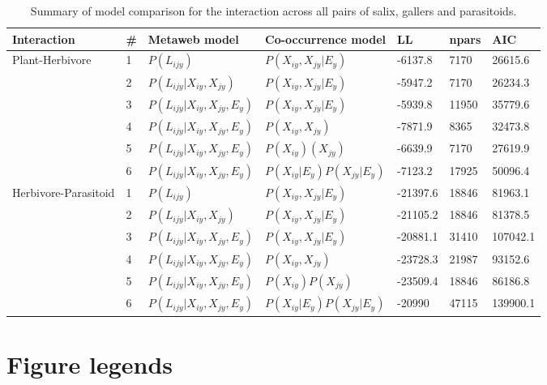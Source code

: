 \documentclass[12pt]{article}
\begin{document}
\begin{landscape}
\begin{table}[]
\centering 
\caption{Summary of model comparison for the interaction across all pairs of salix, gallers and parasitoids.}
\begin{tabular}{lllllll}
\hline
	Interaction & \# & Metaweb model & Co-occurrence model & LL & npars & AIC \\ \hline
	Plant-Herbivore & 1 & $P(L_{ijy})$ & $P(X_{iy},X_{jy}|E_y)$ & -6137.8 & 7170 & 26615.6 \\ 
	 & 2 & $P(L_{ijy}|X_{iy},X_{jy})$ & $P(X_{iy},X_{jy}|E_y)$ & -5947.2 & 7170 & 26234.3 \\ 
	 & 3 & $P(L_{ijy} | X_{iy}, X_{jy}, E_y)$ & $P(X_{iy},X_{jy}|E_y)$ & -5939.8 & 11950 & 35779.6 \\
	 & 4 & $P(L_{ijy} | X_{iy}, X_{jy}, E_y)$ & $P(X_{iy},X_{jy})$ & -7871.9 & 8365 & 32473.8 \\ 
	 & 5 & $P(L_{ijy} | X_{iy}, X_{jy}, E_y)$ & $P(X_{iy})(X_{jy})$ & -6639.9 & 7170 & 27619.9 \\ 
	 & 6 & $P(L_{ijy} | X_{iy}, X_{jy}, E_y)$ & $P(X_{iy}|E_y)P(X_{jy}|E_y)$ & -7123.2 & 17925 & 50096.4 \\ \hline
	Herbivore-Parasitoid & 1 & $P(L_{ijy})$ & $P(X_{iy},X_{jy}|E_y)$ & -21397.6 & 18846 & 81963.1 \\ 
	 & 2 & $P(L_{ijy} | X_{iy}, X_{jy})$ & $P(X_{iy},X_{jy}|E_y)$ & -21105.2 & 18846 & 81378.5 \\ 
	 & 3 & $P(L_{ijy} | X_{iy}, X_{jy}, E_y)$ & $P(X_{iy},X_{jy}|E_y)$ & -20881.1 & 31410 & 107042.1 \\ 
	 & 4 & $P(L_{ijy} | X_{iy}, X_{jy}, E_y)$ & $P(X_{iy},X_{jy})$ & -23728.3 & 21987 & 93152.6 \\ 
	 & 5 & $P(L_{ijy} | X_{iy}, X_{jy}, E_y)$ & $P(X_{iy})P(X_{jy})$ & -23509.4 & 18846 & 86186.8 \\ 
	 & 6 & $P(L_{ijy} | X_{iy}, X_{jy}, E_y)$ & $P(X_{iy}|E_y)P(X_{jy}|E_y)$ & -20990 & 47115 & 139900.1 \\ 
\hline
\end{tabular}
\end{table}
\end{landscape}

\newpage
\section*{Figure legends}
\end{document}
